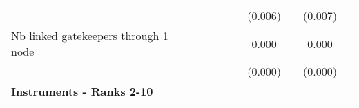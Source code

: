 {\begin{tabular}{l*{8}{c}}
                    &                     &                     &                     &                     &     (0.006)         &                     &     (0.007)         &                     \\
Nb linked gatekeepers through 1 node&                     &                     &                     &                     &       0.000         &                     &       0.000         &                     \\
                    &                     &                     &                     &                     &     (0.000)         &                     &     (0.000)         &                     \\   
\textbf{Instruments - Ranks 2-10}&                     &                     &                     &                     &                     &                     &                     &                     \\
                                   

\end{tabular}}

